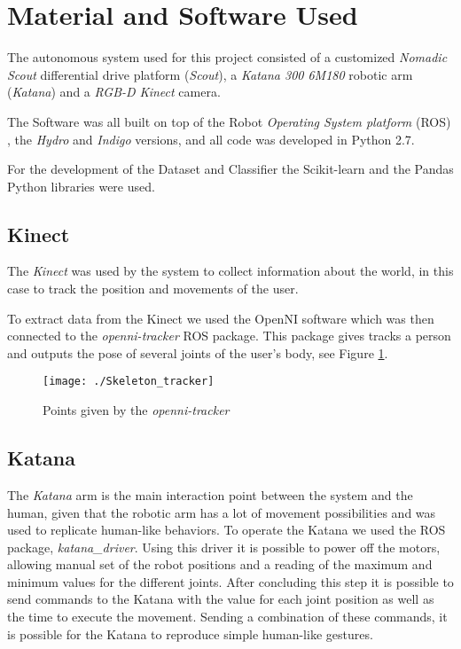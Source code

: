 
\section{Material and Software Used}
The autonomous system used for this project consisted of a customized \textit{Nomadic Scout} differential drive platform (\emph{Scout}), a  \textit{Katana 300 6M180} robotic arm (\textit{Katana}) and a \textit{RGB-D Kinect} camera.

The Software was all built on top of the Robot \textit{Operating System platform} (ROS) \cite{ROS}, the \textit{Hydro} and \textit{Indigo} versions, and all code was developed in Python 2.7.

For the development of the Dataset and Classifier the Scikit-learn \cite{Scikit-Learn} and the Pandas \cite{Pandas} Python libraries were used.	

\subsection{Kinect}
The \textit{Kinect} was used by the system to collect information about the world, in this case to track the position and movements of the user. 

To extract data from the Kinect we used the OpenNI software which was then connected to the  \textit{openni-tracker} ROS package. This package gives tracks a person and outputs the pose of several joints of the user's body, see Figure \ref{fig:skeleton_tracker}.

\begin{figure}[!h]
	\centering
		\texttt{[image: ./Skeleton\_tracker]}
	\caption{Points given by the \textit{openni-tracker}}\label{fig:skeleton_tracker}
\end{figure}

\subsection{Katana}
\label{Material: Katana}
The \textit{Katana} arm is the main interaction point between the system and the human, given that the robotic arm has a lot of movement possibilities and was used to replicate human-like behaviors.
To operate the Katana we used the ROS package, \textit{katana\_driver}.  Using this driver it is possible to power off the motors, allowing manual set of the robot positions and a reading of the maximum and minimum values for the different joints. After concluding this step it is possible to send commands to the Katana with the value for each joint position as well as the time to execute the movement. Sending a combination of these commands, it is possible for the Katana to reproduce simple human-like gestures.\\

